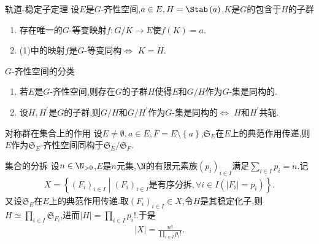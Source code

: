 \begin{theorem}{轨道-稳定子定理}{}
	设$E$是$G$-齐性空间,$a\in E,H=\Stab\left(a\right)$,$K$是$G$的包含于$H$的子群
	\begin{enumerate}
		\item 存在唯一的$G$-等变映射$f:G/K\to E$使$f\left(K\right)=a$.
		\item (1)中的映射$f$是$G$-等变同构$\iff$ $K=H$.
	\end{enumerate}
\end{theorem}

\begin{theorem}{$G$-齐性空间的分类}{}
	\begin{enumerate}
		\item 若$E$是$G$-齐性空间,则存在$G$的子群$H$使得$E$和$G/H$作为$G$-集是同构的.
		\item 设$H,H^{\prime}$是$G$的子群,则$G/H$和$G/H^{\prime}$作为$G$-集是同构的$\iff$ $H$和$H^{\prime}$共轭.
	\end{enumerate}
\end{theorem}

\begin{example}{对称群在集合上的作用}{}
	设$E\neq\emptyset,a\in E,F=E\setminus\left\{a\right\}$,$\mathfrak{S}_{E}$在$E$上的典范作用传递,则$E$作为$\mathfrak{S}_{E}$-齐性空间同构于$\mathfrak{S}_{E}/\mathfrak{S}_{F}$.
\end{example}

\begin{example}{集合的分拆}{}
	设$n\in\N_{>0}$,$E$是$n$元集,$\N$的有限元素族$\left(p_{i}\right)_{i\in I}$满足$\sum\limits_{i\in I}p_{i}=n$.记
	\begin{align*}
		X=\left\{\left(F_{i}\right)_{i\in I}\middle|\left(F_{i}\right)_{i\in I}\text{是有序分拆},\forall i\in I\left(\left|F_{i}\right|=p_{i}\right)\right\}.
	\end{align*}
	又设$\mathfrak{S}_{E}$在$E$上的典范作用传递.取$\left(F_{i}\right)_{i\in I}\in X$,令$H$是其稳定化子,则$H\simeq\prod\limits_{i\in I}\mathfrak{S}_{F_{i}}$,进而$\left|H\right|=\prod\limits_{i\in I}p_{i}!$.于是
	\begin{align*}
		\left|X\right|=\frac{n!}{\prod\limits_{i\in I}p_{i}!}.
	\end{align*}
\end{example}

